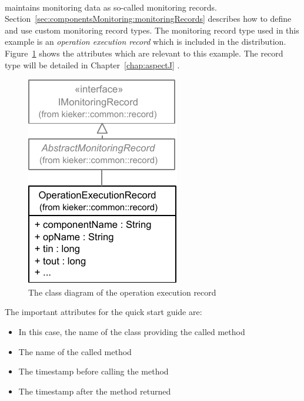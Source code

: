 
\quad\

\noindent \Kieker{} maintains monitoring data as  so-called monitoring records. %
Section~\ref{sec:componentsMonitoring:monitoringRecords} describes how to define and use custom monitoring record types. %
The monitoring record type used in this example is an \textit{operation execution record} which %
is included in the \Kieker{} distribution. %
Figure~\ref{fig:OperationExecutionRecordClassDiagram} shows the %
attributes which  are relevant to this example. %
The record type will be detailed in Chapter~\ref{chap:aspectJ} .

\begin{figure}[H]
\begin{centering}
\includegraphics[scale=1]{images/kieker_OperationExecutionRecord-notraceattributes-inheritance}%
\caption{The class diagram of the operation execution record}
\label{fig:OperationExecutionRecordClassDiagram}
\end{centering}
\end{figure}

\noindent The important attributes for the quick start guide are:

\begin{itemize}
\item[\hskip1em\class{componentName:}] In this case, the name of the class %
providing the called method
\item[\hskip1em\class{opName:}] The name of the called method
\item[\hskip1em\class{tin:}] The timestamp before calling the method
\item[\hskip1em\class{tout:}] The timestamp after the method returned
\end{itemize}

